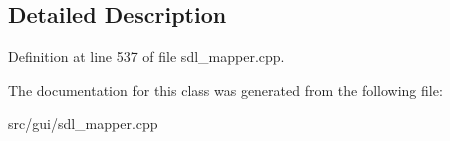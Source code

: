 \subsection{Detailed Description}


Definition at line 537 of file sdl\-\_\-mapper.\-cpp.



The documentation for this class was generated from the following file\-:\begin{DoxyCompactItemize}
\item 
src/gui/sdl\-\_\-mapper.\-cpp\end{DoxyCompactItemize}
